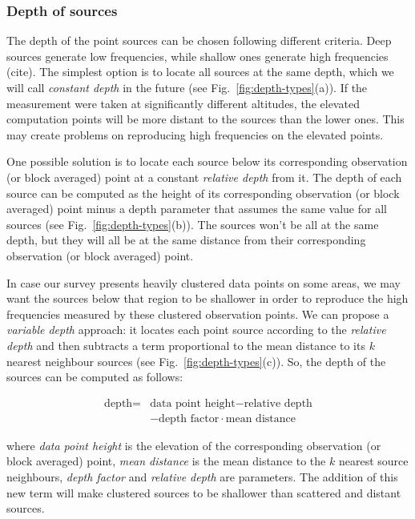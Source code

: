 \documentclass[twocolumn]{article}
\begin{document}
\subsubsection{Depth of sources}

The depth of the point sources can be chosen following different criteria.
Deep sources generate low frequencies, while shallow ones generate high
frequencies (cite).
The simplest option is to locate all sources at the same depth, which we will
call \emph{constant depth} in the future (see Fig.~\ref{fig:depth-types}(a)).
If the measurement were taken at significantly different altitudes, the
elevated computation points will be more distant to the sources than the lower
ones.
This may create problems on reproducing high frequencies on the elevated
points.

One possible solution is to locate each source below its corresponding
observation (or block averaged) point at a constant \emph{relative depth}
from it.
The depth of each source can be computed as the height of its corresponding
observation (or block averaged) point minus a depth parameter that assumes the
same value for all sources (see Fig.~\ref{fig:depth-types}(b)).
The sources won't be all at the same depth, but they will all be at the same
distance from their corresponding observation (or block averaged) point.

In case our survey presents heavily clustered data points on some areas, we may
want the sources below that region to be shallower in order to reproduce the
high frequencies measured by these clustered observation points.
We can propose a \emph{variable depth} approach: it locates each point source
according to the \emph{relative depth} and then subtracts a term proportional
to the mean distance to its $k$ nearest neighbour sources
(see Fig.~\ref{fig:depth-types}(c)).
So, the depth of the sources can be computed as follows:

\begin{equation}
    \begin{split}
        \textrm{depth} =
           &\textrm{data point height} - \textrm{relative depth} \\
           &- \textrm{depth factor} \cdot \textrm{mean distance}
    \end{split}
\end{equation}

\noindent where \emph{data point height} is the elevation of the corresponding
observation (or block averaged) point, \emph{mean distance} is the mean
distance to the $k$ nearest source neighbours, \emph{depth factor} and
\emph{relative depth} are parameters.
The addition of this new term will make clustered sources to be shallower than
scattered and distant sources.
\end{document}
